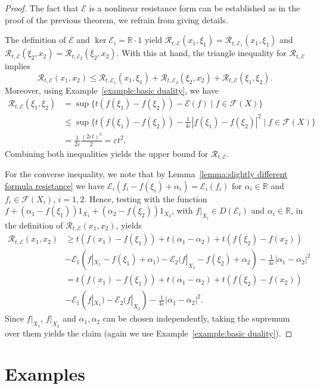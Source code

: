 \documentclass[a4paper,11pt,reqno]{amsart}
\theoremstyle{definition}
\numberwithin{equation}{section}
\newcommand{\cR}{{\mathcal R}}
\newcommand{\cE}{{\mathcal E}}
\newcommand{\cF}{{\mathcal F}}
\newcommand{\R}{{\mathbb R}}
\newcommand{\1}{\mathds{1}}
\begin{document}
\begin{proof}
The fact that $\cE$ is a nonlinear resistance form can be established as in the proof of the previous theorem, we refrain from giving details. 

The definition of $\cE$ and $\ker \cE_i = \R \cdot 1$ yield   $\cR_{t,\cE}(x_1,\xi_1) = \cR_{t,\cE_1}(x_1,\xi_1)$ and $\cR_{t,\cE}(\xi_2,x_2) = \cR_{t,\cE_2}(\xi_2,x_2)$. With this at hand, the triangle  inequality for $\cR_{t,\cE}$ implies  
%
$$\cR_{t,\cE}(x_1,x_2) \leq \cR_{t,\cE_1}(x_1,\xi_1) + \cR_{t,\cE_2}(\xi_2,x_2) + \cR_{t,\cE}(\xi_1,\xi_2).$$
%
Moreover, using Example~\ref{example:basic duality}, we have 
%
\begin{align*}
\cR_{t,\cE}(\xi_1,\xi_2) &= \sup\{t (f(\xi_1) - f(\xi_2)) - \cE(f) \mid f \in \cF(X)\}\\
&\leq \sup\{t (f(\xi_1) - f(\xi_2)) -  \frac{1}{4\varepsilon} |f(\xi_1) - f(\xi_2)|^2 \mid f \in \cF(X)\} \\
&= \frac{1}{2\varepsilon} \frac{(2\varepsilon t)^2}{2} = \varepsilon t^2.
\end{align*}
%
Combining both inequalities yields the upper bound for $\cR_{t,\cE}$.

For the converse inequality, we note that by Lemma~\ref{lemma:slightly different formula resistance}  we have $\cE_i(f_i - f(\xi_i) + \alpha_i) = \cE_i(f_i)$ for $\alpha_i \in \R$ and $f_i \in \cF(X_i)$, $i =1,2$. Hence, testing with the function $f + (\alpha_1 - f(\xi_1))1_{X_1} + (\alpha_2 - f(\xi_2))1_{X_2}$, with $f|_{X_i} \in D(\cE_i)$ and $\alpha_i \in \R$, in the definition of $\cR_{t,\cE}(x_1,x_2)$, yields
%
\begin{align*}
\cR_{t,\cE}(x_1,x_2) &\geq t (f(x_1) - f(\xi_1)) +   t(\alpha_1 - \alpha_2) + t(f(\xi_2) - f(x_2))\\
&- \cE_1(f|_{X_1} - f(\xi_1) + \alpha_1) - \cE_2(f|_{X_2}- f(\xi_2) + \alpha_2)  - \frac{1}{4\varepsilon} |\alpha_1 - \alpha_2|^2\\
 &= t (f(x_1) - f(\xi_1)) +   t(\alpha_1 - \alpha_2) + t(f(\xi_2) - f(x_2))\\
&- \cE_1(f|_{X_1}) - \cE_2(f|_{X_2})  - \frac{1}{4\varepsilon} |\alpha_1 - \alpha_2|^2.
\end{align*}
%
Since $f|_{X_1}$, $f|_{X_2}$ and $\alpha_1,\alpha_2$ can be chosen independently, taking the supremum over them yields the claim (again we use Example~\ref{example:basic duality}).  
%
\end{proof}


\section{Examples}\label{section:examples}
\end{document}
